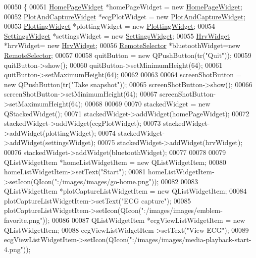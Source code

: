 \begin{DoxyCode}
{00050 \{
00051     \hyperlink{classHomePageWidget}{HomePageWidget} *homePageWidget = \textcolor{keyword}{new} \hyperlink{classHomePageWidget}{HomePageWidget};
00052     \hyperlink{classPlotAndCaptureWidget}{PlotAndCaptureWidget} *ecgPlotWidget = \textcolor{keyword}{new} 
      \hyperlink{classPlotAndCaptureWidget}{PlotAndCaptureWidget};
00053     \hyperlink{classPlottingWidget}{PlottingWidget} *plottingWidget = \textcolor{keyword}{new} \hyperlink{classPlottingWidget}{PlottingWidget};
00054     \hyperlink{classSettingsWidget}{SettingsWidget} *settingsWidget = \textcolor{keyword}{new} \hyperlink{classSettingsWidget}{SettingsWidget};
00055     \hyperlink{classHrvWidget}{HrvWidget} *hrvWidget= \textcolor{keyword}{new} \hyperlink{classHrvWidget}{HrvWidget};
00056     \hyperlink{classRemoteSelector}{RemoteSelector} *bluetoothWidget=\textcolor{keyword}{new} \hyperlink{classRemoteSelector}{RemoteSelector};
00057 
00058     quitButton = \textcolor{keyword}{new} QPushButton(tr(\textcolor{stringliteral}{"Quit"}));
00059     quitButton->show();
00060     quitButton->setMinimumHeight(64);
00061     quitButton->setMaximumHeight(64);
00062 
00063 
00064     screenShotButton = \textcolor{keyword}{new} QPushButton(tr(\textcolor{stringliteral}{"Take snapshot"}));
00065     screenShotButton->show();
00066     screenShotButton->setMinimumHeight(64);
00067     screenShotButton->setMaximumHeight(64);
00068 
00069 
00070     stackedWidget = \textcolor{keyword}{new} QStackedWidget();
00071     stackedWidget->addWidget(homePageWidget);
00072     stackedWidget->addWidget(ecgPlotWidget);
00073     stackedWidget->addWidget(plottingWidget);
00074     stackedWidget->addWidget(settingsWidget);
00075     stackedWidget->addWidget(hrvWidget);
00076     stackedWidget->addWidget(bluetoothWidget);
00077 
00078 
00079     QListWidgetItem *homeListWidgetItem = \textcolor{keyword}{new} QListWidgetItem;
00080     homeListWidgetItem->setText(\textcolor{stringliteral}{"Start"});
00081     homeListWidgetItem->setIcon(QIcon(\textcolor{stringliteral}{":/images/images/go-home.png"}));
00082 
00083     QListWidgetItem *plotCaptureListWidgetItem = \textcolor{keyword}{new} QListWidgetItem;
00084     plotCaptureListWidgetItem->setText(\textcolor{stringliteral}{"ECG capture"});
00085     plotCaptureListWidgetItem->setIcon(QIcon(\textcolor{stringliteral}{":/images/images/emblem-favorite.png"}));
00086 
00087     QListWidgetItem *ecgViewListWidgetItem = \textcolor{keyword}{new} QListWidgetItem;
00088     ecgViewListWidgetItem->setText(\textcolor{stringliteral}{"View ECG"});
00089     ecgViewListWidgetItem->setIcon(QIcon(\textcolor{stringliteral}{":/images/images/media-playback-start-4.png"}));
}
\end{DoxyCode}
